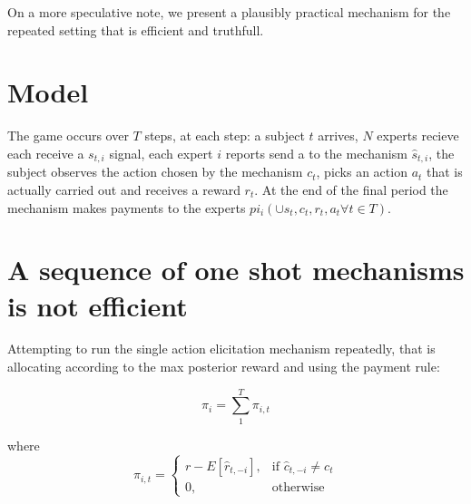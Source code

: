 




On a more speculative note, we present a plausibly practical mechanism for the repeated setting that is  efficient and truthfull.




\section{Model}

The game occurs over $T$ steps, at each step: a subject $t$ arrives, $N$ experts recieve each receive a $s_{t,i}$ signal, each expert $i$ reports send a to the mechanism $\hat{s}_{t,i}$, the subject observes the action chosen by the mechanism $c_t$, picks an action $a_t$ that is actually carried out and receives a reward $r_t$.
At the end of the final period the mechanism makes payments to the experts $pi_i( \cup \hat{s}_t,c_t,r_t,a_t \forall t \in T)$.

\section{A sequence of one shot mechanisms is not efficient}

Attempting to run the single action elicitation mechanism repeatedly, that is allocating according to the max posterior reward and using the payment rule:

\[
    \pi_i = \sum_1^T \pi_{i,t} 
\]

where 
\[
    \pi_{i,t} =
\begin{cases}
    r - E[\hat{r}_{t,-i}] ,& \text{if } \hat{c}_{t,-i} \neq c_t\\
    0,              & \text{otherwise}
\end{cases}
\]


